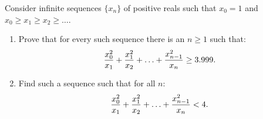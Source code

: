 Consider infinite sequences $\{x_n\}$ of positive reals such that $x_0=1$ and $x_0\ge x_1\ge x_2\ge\ldots$.

\begin{enumerate}[label = (\alph*)]
	\item Prove that for every such sequence there is an $n\ge1$ such that:
		\[ {x_0^2\over x_1}+{x_1^2\over x_2}+\ldots+{x_{n-1}^2\over x_n}\ge3.999. \]
	\item Find such a sequence such that for all $n$:
		\[ {x_0^2\over x_1}+{x_1^2\over x_2}+\ldots+{x_{n-1}^2\over x_n}<4. \]
\end{enumerate}
